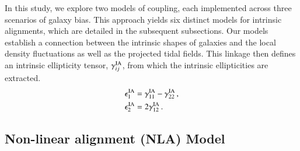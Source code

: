 In this study, we explore two models of coupling, each implemented across three scenarios of galaxy bias.
This approach yields six distinct models for intrinsic alignments, which are detailed in the subsequent subsections. 
Our models establish a connection between the intrinsic shapes of galaxies and the local density fluctuations as well as the projected tidal fields. 
This linkage then defines an intrinsic ellipticity tensor, $\gamma_{ij}^{\rm IA}$, from which the intrinsic ellipticities are extracted.
\begin{equation}
\begin{split}
\epsilon_{1}^{\rm IA} &= \gamma_{11}^{\rm IA} - \gamma_{22}^{\rm IA} \, , 
\\
\epsilon_{2}^{\rm IA} &= 2 \gamma_{12}^{\rm IA} \, .
\label{eq:tidal_th_deltaNLA}
\end{split}
\end{equation}

 
\subsection{Non-linear alignment (NLA) Model}

